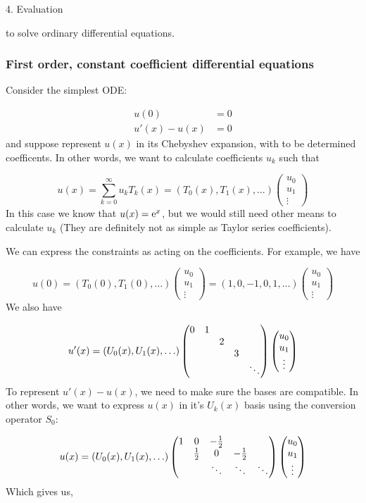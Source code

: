 \documentclass[12pt,a4paper]{article}
\def\half{ {1 \over 2} }
\def\E{ {\rm e} }
\begin{document}
4. Evaluation

to solve ordinary differential equations.

\subsubsection{First order, constant coefficient differential equations}
Consider the simplest ODE:


\begin{align*}
u(0) &= 0 \\
u'(x) - u(x) &= 0 
\end{align*}
and suppose  represent $u(x)$ in its Chebyshev expansion, with to be determined coefficents. In other words, we want to calculate coefficients $u_k$ such that

\[
u(x) = \sum_{k=0}^\infty u_k T_k(x) = (T_0(x), T_1(x), \ldots) \begin{pmatrix} u_0 \\ u_1 \\ \vdots \end{pmatrix}
\]
In this case we know that $u(x) = \E^x$, but we would still need other means to calculate $u_k$ (They are definitely not as simple as Taylor series coefficients).

We can express the constraints as acting on the coefficients. For example, we have

\[
u(0) = (T_0(0), T_1(0), \ldots) \begin{pmatrix} u_0\\u_1\\\vdots \end{pmatrix} = (1,0,-1,0,1,\ldots)  \begin{pmatrix} u_0\\u_1\\\vdots \end{pmatrix} 
\]
We also have 

\[
u'(x) = (U_0(x),U_1(x),\ldots) \begin{pmatrix}
0 & 1 \cr 
&& 2 \cr
&&& 3 \cr
&&&&\ddots 
\end{pmatrix}\begin{pmatrix} u_0\\u_1\\\vdots \end{pmatrix} 
\]
To represent $u'(x) - u(x)$, we need to make sure the bases are compatible. In other words, we want to express $u(x)$ in it's $U_k(x)$ basis using the conversion operator $S_0$:

\[
u(x) = (U_0(x),U_1(x),\ldots) \begin{pmatrix}
    1 &0 & -\half \cr 
& \half & 0 & -\half \cr
&&\ddots & \ddots & \ddots
\end{pmatrix}\begin{pmatrix} u_0\\u_1\\\vdots \end{pmatrix} 
\]
Which gives us, 
\end{document}
